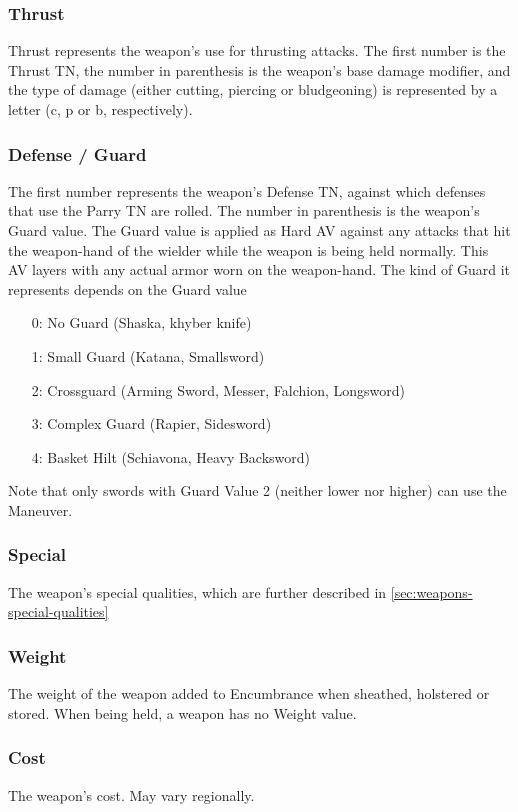 \documentclass[oneside,11pt,english]{book}
\begin{document}
\subsubsection{Thrust}
Thrust represents the weapon’s use for thrusting attacks. The first number is the Thrust TN, the number in parenthesis 
is the weapon’s base damage modifier, and the type of damage (either cutting, piercing or bludgeoning) is represented 
by a letter (c, p or b, respectively). 
\subsubsection{Defense / Guard}
The first number represents the weapon’s Defense TN, against which defenses that use the Parry TN are rolled. The 
number in parenthesis is the weapon’s Guard value. The Guard value is applied as Hard AV against any attacks that hit
the weapon-hand of the wielder while the weapon is being held normally. This AV layers with any actual armor worn 
on the weapon-hand. The kind of Guard it represents depends on the Guard value
\begin{itemize}
\item [0:] No Guard (Shaska, khyber knife)
\item [1:] Small Guard (Katana, Smallsword)
\item [2:] Crossguard (Arming Sword, Messer, Falchion, Longsword)
\item [3:] Complex Guard (Rapier, Sidesword)
\item [4:] Basket Hilt (Schiavona, Heavy Backsword)
\end{itemize}
Note that only swords with Guard Value 2 (neither lower nor higher) can use the  Maneuver.
\subsubsection{Special}
The weapon’s special qualities, which are further described in \autoref{sec:weapons-special-qualities}
\subsubsection{Weight}
The weight of the weapon added to Encumbrance when sheathed, holstered or stored. When being held, a weapon has 
no Weight value.
\subsubsection{Cost}
The weapon’s cost. May vary regionally.
\end{document}
